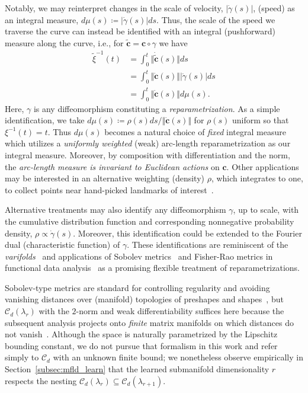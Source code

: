 \documentclass[pdflatex,iicol]{sn-jnl}%
\theoremstyle{thmstyleone}%
\theoremstyle{thmstyletwo}%
\theoremstyle{thmstylethree}%
\begin{document}
Notably, we may reinterpret changes in the scale of velocity, $\vert \dot{\gamma}(s) \vert$, (speed) as an integral measure, $d\mu(s) \coloneqq \vert \dot{\gamma}(s) \vert ds$. Thus, the scale of the speed we traverse the curve can instead be identified with an integral (pushforward) measure along the curve, i.e., for $\tilde{\boldsymbol{c}} = \boldsymbol{c}\circ \gamma$ we have
\begin{align}
    \tilde{\xi}^{-1}(t) &= \int_0^t \Vert \dot{\tilde{\boldsymbol{c}}}(s) \Vert ds \\ \nonumber
    & = \int_0^{t} \Vert \dot{\boldsymbol{c}}(s) \Vert\vert \dot{\gamma}(s) \vert ds \\ \nonumber
    & = \int_0^{t} \Vert \dot{\boldsymbol{c}}(s) \Vert d\mu(s). \nonumber
\end{align}
Here, $\gamma$ is any diffeomorphism constituting a \textit{reparametrization}. As a simple identification, we take $d\mu(s) \coloneqq \rho(s)ds/\Vert \dot{\boldsymbol{c}}(s)\Vert$ for $\rho(s)$ uniform so that $\xi^{-1}(t) = t$. Thus $d\mu(s)$ becomes a natural choice of \textit{fixed} integral measure which utilizes a \textit{uniformly weighted} (weak) arc-length reparametrization as our integral measure. Moreover, by composition with differentiation and the norm, the \textit{arc-length measure is invariant to Euclidean actions} on $\boldsymbol{c}$. Other applications may be interested in an alternative weighting (density) $\rho$, which integrates to one, to collect points near hand-picked landmarks of interest~\cite{Doronina2023, grey2023separable}.

Alternative treatments may also identify any diffeomorphism $\gamma$, up to scale, with the cumulative distribution function and corresponding nonnegative probability density, $\rho \propto \dot{\gamma}(s)$. Moreover, this identification could be extended to the Fourier dual (characteristic function) of $\gamma$. These identifications are reminiscent of the \textit{varifolds}~\cite{younes2008metric, charon2013varifold, kaltenmark2017varifolds, pierson2022shape} and applications of Sobolev metrics~\cite{bauer2017sobolev} and Fisher-Rao metrics in functional data analysis~\cite{tucker2013generative, srivastava2016functional} as a promising flexible treatment of reparametrizations.

Sobolev-type metrics are standard for controlling regularity and avoiding vanishing distances over (manifold) topologies of preshapes and shapes~\cite{michor2004vanishing,bauer2014overview,micheli2013matrix}, but $\mathcal{C}_d(\lambda_r)$ with the $2$-norm and weak differentiability suffices here because the subsequent analysis projects onto \emph{finite} matrix manifolds on which distances do not vanish~\cite{bauer2014overview}. Although the space is naturally parametrized by the Lipschitz bounding constant, we do not pursue that formalism in this work and refer simply to $\mathcal{C}_d$ with an unknown finite bound; we nonetheless observe empirically in Section~\ref{subsec:mfld_learn} that the learned submanifold dimensionality $r$ respects the nesting $\mathcal{C}_d(\lambda_r)\subseteq\mathcal{C}_d(\lambda_{r+1})$.
\end{document}
